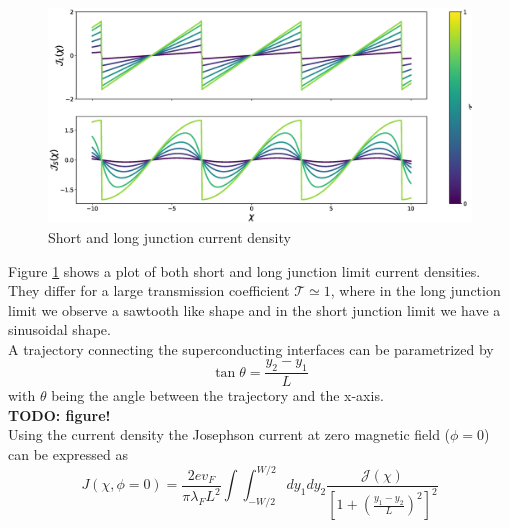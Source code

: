 \begin{figure}
\centering
\includegraphics[width=\textwidth]{figure/analyticalmodel/current_density_all}
\caption{Short and long junction current density}
\label{fig:current_density}
\end{figure}
Figure \ref{fig:current_density} shows a plot of both short and long junction limit current densities. They differ for a large transmission coefficient $\mathcal{T} \simeq 1$, where in the long junction limit we observe a sawtooth like shape and in the short junction limit we have a sinusoidal shape.\\
A trajectory connecting the superconducting interfaces can be parametrized by 
\begin{equation}
\tan \theta = \frac{y_2 - y_1}{L}
\label{eq:parametrization}
\end{equation}
with $\theta$ being the angle between the trajectory and the x-axis.\\ \textbf{TODO: figure!}\\ Using the current density the Josephson current at zero magnetic field ($\phi = 0$) can be expressed as 
\begin{equation}
J\left(\chi, \phi=0\right) = \frac{2 e v_F}{\pi \lambda_F L^2}  \int \int_{-W/2}^{W/2} d y_1 d y_2 \frac{\mathcal{J}(\chi)}{\left[ 1 + \left(\frac{y_1 - y_2}{L}\right)^2\right]^2}
\label{eq:josephson_current_zero_b}
\end{equation}
